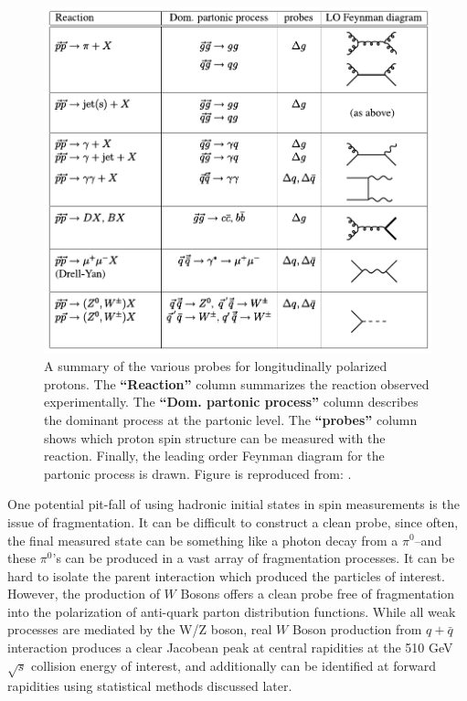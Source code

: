 \begin{figure}[ht]
  \centering
  \includegraphics[width=\linewidth]{./figures/spin_probes.pdf}
  \caption{
    A summary of the various probes for longitudinally polarized protons. The
    \textbf{``Reaction''} column summarizes the reaction observed experimentally.
    The \textbf{``Dom. partonic process''} column describes the dominant process
    at the partonic level. The \textbf{``probes''} column shows which proton spin
    structure can be measured with the reaction. Finally, the leading order
    Feynman diagram for the partonic process is drawn. Figure is reproduced
    from: \cite{Aidala2005}.
  }
  \label{fig:spin_probes_masterspin}

\end{figure}

One potential pit-fall of using hadronic initial states in spin measurements is
the issue of fragmentation. It can be difficult to construct a clean probe,
since often, the final measured state can be something like a photon decay from
a $\pi^0$--and these $\pi^0$'s can be produced in a vast array of fragmentation
processes. It can be hard to isolate the parent interaction which produced the
particles of interest. However, the production of $W$ Bosons offers a clean probe
free of fragmentation into the polarization of anti-quark parton distribution
functions. While all weak processes are mediated by the W/Z boson, real $W$ Boson
production from $q+\bar{q}$ interaction produces a clear Jacobean peak at
central rapidities at the 510 GeV $\sqrt{s}$ collision energy of interest, and
additionally can be identified at forward rapidities using statistical methods
discussed later.

